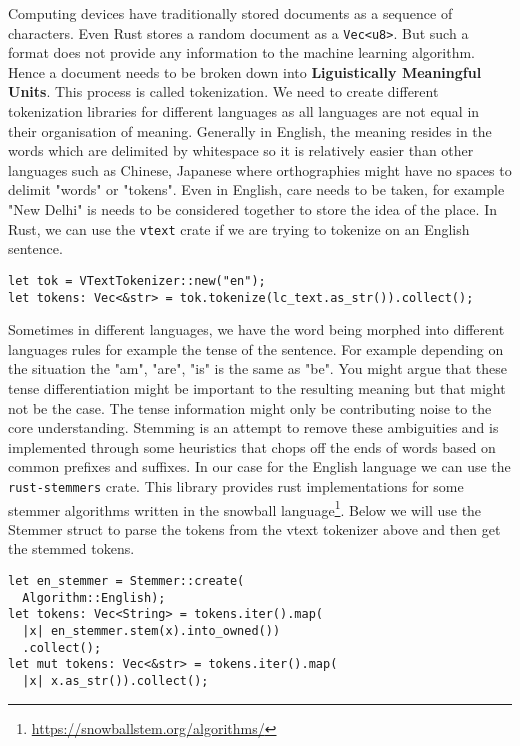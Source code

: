 \documentclass{book}
\begin{document}
Computing devices have traditionally stored documents as a sequence of characters. Even Rust stores a random document as a \lstinline{Vec<u8>}. But such a format does not provide any information to the machine learning algorithm. Hence a document needs to be broken down into \textbf{Liguistically Meaningful Units}. This process is called tokenization. We need to create different tokenization libraries for different languages as all languages are not equal in their organisation of meaning. Generally in English, the meaning resides in the words which are delimited by whitespace so it is relatively easier than other languages such as Chinese, Japanese where orthographies might have no spaces to delimit "words" or "tokens". Even in English, care needs to be taken, for example "New Delhi" is needs to be considered together to store the idea of the place. In Rust, we can use the \lstinline{vtext} crate if we are trying to tokenize on an English sentence.

\begin{lstlisting}[caption={chapter5\\/fasttext\\-model\\/src\\/main\\.rs}, basicstyle=\small]
let tok = VTextTokenizer::new("en");
let tokens: Vec<&str> = tok.tokenize(lc_text.as_str()).collect();
\end{lstlisting}

Sometimes in different languages, we have the word being morphed into different languages rules for example the tense of the sentence. For example depending on the situation the "am", "are", "is" is the same as "be". You might argue that these tense differentiation might be important to the resulting meaning but that might not be the case. The tense information might only be contributing noise to the core understanding. Stemming is an attempt to remove these ambiguities and is implemented through some heuristics that chops off the ends of words based on common prefixes and suffixes. In our case for the English language we can use the \lstinline{rust-stemmers} crate. This library provides rust implementations for some stemmer algorithms written in the snowball language\footnote{\href{}{https://snowballstem.org/algorithms/}}. Below we will use the Stemmer struct to parse the tokens from the vtext tokenizer above and then get the stemmed tokens.

\begin{lstlisting}[caption={chapter5\\/fasttext\\-model\\/src\\/main\\.rs}, basicstyle=\small]
let en_stemmer = Stemmer::create(
  Algorithm::English);
let tokens: Vec<String> = tokens.iter().map(
  |x| en_stemmer.stem(x).into_owned())
  .collect();
let mut tokens: Vec<&str> = tokens.iter().map(
  |x| x.as_str()).collect();
\end{lstlisting}
\end{document}
